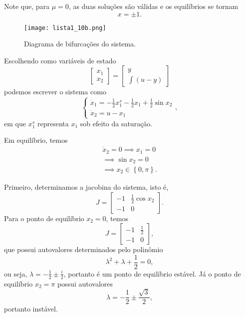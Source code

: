 \documentclass[a4paper]{report}
\begin{document}
Note que, para $\mu=0$, as duas soluções são válidas e os equilíbrios se tornam \[
x = \pm 1
.\] 


\begin{figure}[H]
    \centering
    \texttt{[image: lista1\_10b.png]}
    \caption{Diagrama de bifurcações do sistema.}
    \label{fig:lista1_10b-png}
\end{figure}



Escolhendo como variáveis de estado \[
\begin{bmatrix} x_1 \\ x_2 \end{bmatrix}  = \begin{bmatrix} y \\ \int \left(  u-y\right)  \end{bmatrix} 
\] podemos escrever o sistema como \[
\begin{cases}
    \dot{x}_1 = -\frac{1}{2} x_1^{s} -\frac{1}{2} x_1+ \frac{1}{2}\sin x_2 \\
    \dot{x}_2 = u-x_1
\end{cases}
,\] em que $x_1^{s}$ representa $x_1$ sob efeito da saturação.


Em equilíbrio, temos 
\begin{align*}
    \dot{x}_2 = 0 \implies x_1=0 \\
    \implies \sin x_2 = 0 \\
    \implies x_2 \in \left\{ 0, \pi \right\} 
.\end{align*}


Primeiro, determinamos a jacobina do sistema, isto é, \[
    J = \begin{bmatrix} -1 & \frac{1}{2}\cos x_2 \\ -1 & 0 \end{bmatrix} 
.\] Para o ponto de equilíbrio $x_2 = 0$, temos  \[
J = \begin{bmatrix} -1 & \frac{1}{2} \\ -1 & 0 \end{bmatrix} 
,\] que possui autovalores determinados pelo polinômio \[
\lambda^2 + \lambda + \frac{1}{2} = 0
,\] ou seja, $\lambda = -\frac{1}{2} \pm \frac{i}{2}$, portanto é um ponto de equilíbrio estável. Já o ponto de equilíbrio $x_2 = \pi$ possui autovalores \[
\lambda = -\frac{1}{2} \pm \frac{\sqrt{3} }{2}
,\] portanto instável.
\end{document}
